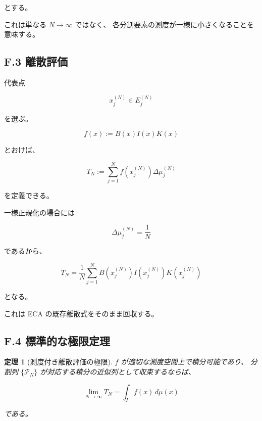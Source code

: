 \documentclass[a4paper,11pt]{article}
\newtheorem{theorem}[definition]{定理}
\begin{document}
とする。

これは単なる $N\to\infty$ ではなく、
各分割要素の測度が一様に小さくなることを意味する。


\subsection{F.3 離散評価}

代表点

\begin{equation}
    x_j^{(N)}\in E_j^{(N)}
\end{equation}

を選ぶ。

\begin{equation}
    f(x)
    :=
    B(x)I(x)K(x)
\end{equation}

とおけば、

\begin{equation}
    T_N
    :=
    \sum_{j=1}^{N}
    f(x_j^{(N)})
    \Delta\mu_j^{(N)}
\end{equation}

を定義できる。

一様正規化の場合には

\begin{equation}
    \Delta\mu_j^{(N)}
    =
    \frac1N
\end{equation}

であるから、

\begin{equation}
    \boxed{
        T_N
        =
        \frac1N
        \sum_{j=1}^{N}
        B(x_j^{(N)})
        I(x_j^{(N)})
        K(x_j^{(N)})
    }
\end{equation}

となる。

これは ECA の既存離散式をそのまま回収する。


\subsection{F.4 標準的な極限定理}

\begin{theorem}[測度付き離散評価の極限]
$f$ が適切な測度空間上で積分可能であり、
分割列 $\{\mathcal{P}_N\}$ が対応する積分の近似列として収束するならば、

\begin{equation}
    \lim_{N\to\infty}
    T_N
    =
    \int_I f(x)\,d\mu(x)
\end{equation}

である。
\end{theorem}
\end{document}
